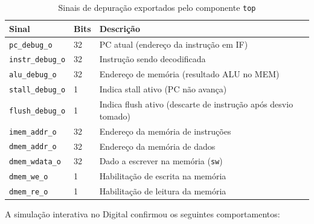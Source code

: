 \documentclass[12pt, a4paper]{article}
\newcommand{\code}[1]{\texttt{#1}}
\begin{document}
\begin{table}[H]
  \centering
  \caption{Sinais de depuração exportados pelo componente \code{top}}
  \small{}
  \begin{tabular}{lll}
    \toprule
    \rowcolor{headerblue}
    \color{white}\textbf{Sinal} & \color{white}\textbf{Bits} &
    \color{white}\textbf{Descrição} \\
    \midrule
    \code{pc\_debug\_o}    & 32 & PC atual (endereço da instrução em IF) \\
    \code{instr\_debug\_o} & 32 & Instrução sendo decodificada \\
    \code{alu\_debug\_o}   & 32 & Endereço de memória (resultado ALU no MEM) \\
    \code{stall\_debug\_o} & 1  & Indica stall ativo (PC não avança) \\
    \code{flush\_debug\_o} & 1  & Indica flush ativo (descarte de instrução após desvio tomado) \\
    \code{imem\_addr\_o}   & 32 & Endereço da memória de instruções \\
    \code{dmem\_addr\_o}   & 32 & Endereço da memória de dados \\
    \code{dmem\_wdata\_o}  & 32 & Dado a escrever na memória (\code{sw}) \\
    \code{dmem\_we\_o}     & 1  & Habilitação de escrita na memória \\
    \code{dmem\_re\_o}     & 1  & Habilitação de leitura da memória \\
    \bottomrule
  \end{tabular}
\end{table}

A simulação interativa no Digital confirmou os seguintes comportamentos:
\end{document}
